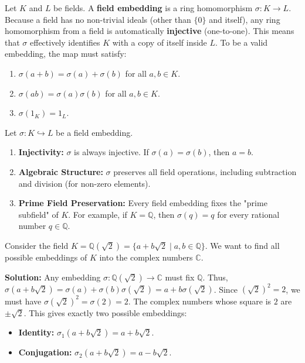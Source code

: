 \begin{definition}
Let $K$ and $L$ be fields. A \textbf{field embedding} is a ring homomorphism $\sigma: K \to L$. 
Because a field has no non-trivial ideals (other than $\{0\}$ and itself), any ring homomorphism from a field is automatically \textbf{injective} (one-to-one). This means that $\sigma$ effectively identifies $K$ with a copy of itself inside $L$.
To be a valid embedding, the map must satisfy:
\begin{enumerate}
    \item $\sigma(a + b) = \sigma(a) + \sigma(b)$ for all $a, b \in K$.
    \item $\sigma(ab) = \sigma(a)\sigma(b)$ for all $a, b \in K$.
    \item $\sigma(1_K) = 1_L$.
\end{enumerate}
\end{definition}

\begin{theorem}
Let $\sigma: K \hookrightarrow L$ be a field embedding.
\begin{enumerate}
    \item \textbf{Injectivity:} $\sigma$ is always injective. If $\sigma(a) = \sigma(b)$, then $a = b$.
    \item \textbf{Algebraic Structure:} $\sigma$ preserves all field operations, including subtraction and division (for non-zero elements).
    \item \textbf{Prime Field Preservation:} Every field embedding fixes the "prime subfield" of $K$. For example, if $K = \mathbb{Q}$, then $\sigma(q) = q$ for every rational number $q \in \mathbb{Q}$.
\end{enumerate}
\end{theorem}

\begin{example}
Consider the field $K = \mathbb{Q}(\sqrt{2}) = \{ a + b\sqrt{2} \mid a, b \in \mathbb{Q} \}$. We want to find all possible embeddings of $K$ into the complex numbers $\mathbb{C}$.

\textbf{Solution:}\newline
Any embedding $\sigma: \mathbb{Q}(\sqrt{2}) \to \mathbb{C}$ must fix $\mathbb{Q}$. Thus, $\sigma(a + b\sqrt{2}) = \sigma(a) + \sigma(b)\sigma(\sqrt{2}) = a + b\sigma(\sqrt{2})$. 
Since $(\sqrt{2})^2 = 2$, we must have $\sigma(\sqrt{2})^2 = \sigma(2) = 2$.
The complex numbers whose square is $2$ are $\pm \sqrt{2}$. This gives exactly two possible embeddings:
\begin{itemize}
    \item \textbf{Identity:} $\sigma_1(a + b\sqrt{2}) = a + b\sqrt{2}$.
    \item \textbf{Conjugation:} $\sigma_2(a + b\sqrt{2}) = a - b\sqrt{2}$.
\end{itemize}
\end{example}

